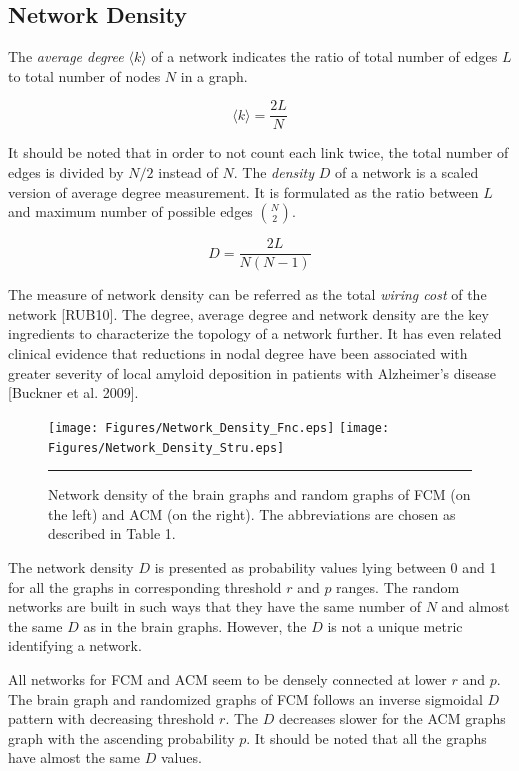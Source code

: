 \subsection{Network Density}
The \textit{average degree} $\langle k \rangle$ of a network indicates the ratio of total number of edges $L$ to total number of nodes $N$ in a graph. 

\begin{equation}
\langle k \rangle = \frac{2L}{N}
\end{equation}

It should be noted that in order to not count each link twice, the total number of edges is divided by $N/2$ instead of $N$. The \textit{density} $D$ of a network is a scaled version of average degree measurement. It is formulated as the ratio between $L$ and maximum number of possible edges ${N \choose 2}$. 

\begin{equation}
D = \frac{2L}{N(N-1)}
\end{equation}	

The measure of network density can be referred as the total \textit{wiring cost} of the network [RUB10]. The degree, average degree and network density are the key ingredients to characterize the topology of a network further. It has even related clinical evidence that reductions in nodal degree have been associated with greater severity of local amyloid deposition in patients with Alzheimer's disease [Buckner et al. 2009]. 

\begin{figure}[htbp]
  \centering
	\texttt{[image: Figures/Network\_Density\_Fnc.eps]}
	\texttt{[image: Figures/Network\_Density\_Stru.eps]}  
    \rule{35em}{0.5pt}
    \caption[Network Density]{Network density of the brain graphs and random graphs of FCM (on the left) and ACM (on the right). The abbreviations are chosen as described in Table 1.}
  \label{fig:Network Density}
\end{figure}


The network density $D$ is presented as probability values lying between 0 and 1 for all the graphs in corresponding threshold $r$ and $p$ ranges. The random networks are built in such ways that they have the same number of $N$ and almost the same $D$ as in the brain graphs. However, the $D$ is not a unique metric identifying a network.

All networks for FCM and ACM seem to be densely connected at lower $r$ and $p$. The brain graph and randomized graphs of FCM follows an inverse sigmoidal $D$ pattern with decreasing threshold $r$. The $D$ decreases slower for the ACM graphs graph with the ascending probability $p$. It should be noted that all the graphs have almost the same $D$ values. 

